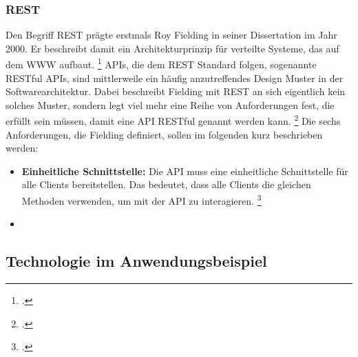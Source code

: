 \subsubsection*{REST}
Den Begriff \ac{REST} prägte erstmals Roy Fielding in seiner Dissertation im Jahr 2000. Er beschreibt damit ein Architekturprinzip für verteilte Systeme, das auf dem \ac{WWW} aufbaut. \footcite[Vgl. ][S. 76]{REST2000} \ac{API}s, die dem REST Standard folgen, sogenannte \ac{REST}ful \ac{API}s, sind mittlerweile ein häufig anzutreffendes Design Muster in der Softwarearchitektur. Dabei beschreibt Fielding mit \ac{REST} an sich eigentlich kein solches Muster, sondern legt viel mehr eine Reihe von Anforderungen fest, die erfüllt sein müssen, damit eine \ac{API} \ac{REST}ful genannt werden kann. \footcite[Vgl. ][S. XV]{richardson2007web} Die sechs Anforderungen, die Fielding definiert, sollen im folgenden kurz beschrieben werden:
\begin{itemize}
  \item 
  \textbf{Einheitliche Schnittstelle:} Die \ac{API} muss eine einheitliche Schnittstelle für alle Clients bereitstellen. Das bedeutet, dass alle Clients die gleichen Methoden verwenden, um mit der \ac{API} zu interagieren. \footcite[Vgl. ][S. 77]{REST2000} 
  \item
  \textbf{}
\end{itemize}




\subsection{Technologie im Anwendungsbeispiel}

